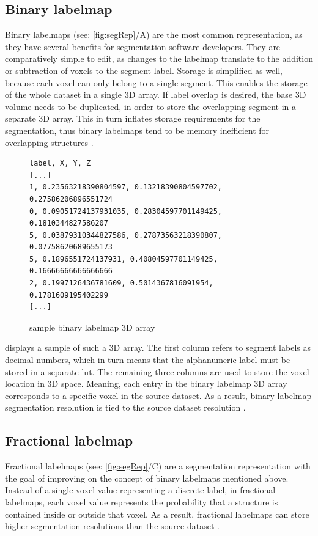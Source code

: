 \subsection{Binary labelmap}\label{s:b-binary-labelmap}
Binary labelmaps (see: \cref{fig:segRep}/A) are the most common representation, as they have several benefits for segmentation software developers.
They are comparatively simple to edit, as changes to the labelmap translate to the addition or subtraction of voxels to the segment label.
Storage is simplified as well, because each voxel can only belong to a single segment.
This enables the storage of the whole dataset in a single 3D array.
If label overlap is desired, the base 3D volume needs to be duplicated,
in order to store the overlapping segment in a separate 3D array.
This in turn inflates storage requirements for the segmentation,
thus binary labelmaps tend to be memory inefficient for overlapping structures \cite{slicercommunity3DSlicerImage2022}.
\begin{figure}[h]
	\begin{verbatim}
label, X, Y, Z
[...]
1, 0.23563218390804597, 0.13218390804597702, 0.27586206896551724
0, 0.09051724137931035, 0.28304597701149425, 0.1810344827586207
5, 0.03879310344827586, 0.27873563218390807, 0.07758620689655173
5, 0.1896551724137931, 0.40804597701149425, 0.16666666666666666
2, 0.1997126436781609, 0.5014367816091954, 0.1781609195402299
[...]
\end{verbatim}
	\caption{sample binary labelmap 3D array}\label{fig:binary-array}
\end{figure}

\noindent
{} displays a sample of such a 3D array.
The first column refers to segment labels as decimal numbers,
which in turn means that the alphanumeric label must be stored in a separate \acrfull{lut}.
The remaining three columns are used to store the voxel location in 3D space.
Meaning, each entry in the binary labelmap 3D array corresponds to a specific voxel in the source dataset.
As a result, binary labelmap segmentation resolution is tied to the source dataset resolution \cite{pinterPolymorphSegmentationRepresentation2019,sunderlandFractionalLabelmapsComputing2017,weber3DSlicerPlatform2022}.


\subsection{Fractional labelmap}\label{s:b-fractional-labelmap}
Fractional labelmaps (see: \cref{fig:segRep}/C) are a segmentation representation with the goal of improving on the concept of binary labelmaps mentioned above.
Instead of a single voxel value representing a discrete label, in fractional labelmaps,
each voxel value represents the probability that a structure is contained inside or outside that voxel.
As a result, fractional labelmaps can store higher segmentation resolutions than the source dataset
\cite{warfieldFractionalSegmentationWhite1999,noePartialVolumeSegmentation2001,pinterPolymorphSegmentationRepresentation2019,sunderlandFractionalLabelmapsComputing2017,weber3DSlicerPlatform2022}.



